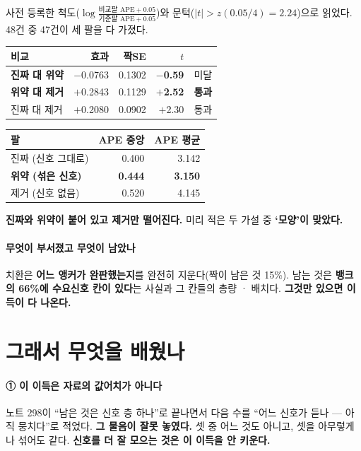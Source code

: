 \documentclass[10pt]{article}
\begin{document}
사전 등록한 척도($\log\frac{\text{비교팔 APE}+0.05}{\text{기준팔 APE}+0.05}$)와
문턱($|t|{>}z(0.05/4){=}2.24$)으로 읽었다. 48건 중 47건이 세 팔을 다 가졌다.

\begin{center}\small
\begin{tabular}{lrrrl}
\hline
비교 & 효과 & 짝SE & $t$ & \\
\hline
\textbf{진짜 대 위약} & $-$0.0763 & 0.1302 & \textbf{$-$0.59} & 미달 \\
\textbf{위약 대 제거} & $+$0.2843 & 0.1129 & \textbf{$+$2.52} & \textbf{통과} \\
진짜 대 제거 & $+$0.2080 & 0.0902 & $+$2.30 & 통과 \\
\hline
\end{tabular}
\end{center}

\begin{center}\footnotesize
\begin{tabular}{lrr}
\hline
팔 & APE 중앙 & APE 평균 \\
\hline
진짜 (신호 그대로) & 0.400 & 3.142 \\
\textbf{위약 (섞은 신호)} & \textbf{0.444} & \textbf{3.150} \\
제거 (신호 없음) & 0.520 & 4.145 \\
\hline
\end{tabular}
\end{center}

\textbf{진짜와 위약이 붙어 있고 제거만 떨어진다.} 미리 적은 두 가설 중
\textbf{`모양'이 맞았다.}

\paragraph{무엇이 부서졌고 무엇이 남았나} 치환은 \textbf{어느 앵커가
완판했는지}를 완전히 지운다(짝이 남은 것 15\%). 남는 것은 \textbf{뱅크의
66\%에 수요신호 칸이 있다}는 사실과 그 칸들의 총량 · 배치다. \textbf{그것만
있으면 이득이 다 나온다.}

\section{그래서 무엇을 배웠나}

\paragraph{① 이 이득은 자료의 값어치가 아니다} 노트 298이 ``남은 것은
신호 층 하나''로 끝나면서 다음 수를 ``어느 신호가 듣나 --- 아직 뭉치다''로
적었다. \textbf{그 물음이 잘못 놓였다.} 셋 중 어느 것도 아니고, 셋을
아무렇게나 섞어도 같다. \textbf{신호를 더 잘 모으는 것은 이 이득을 안
키운다.}
\end{document}
